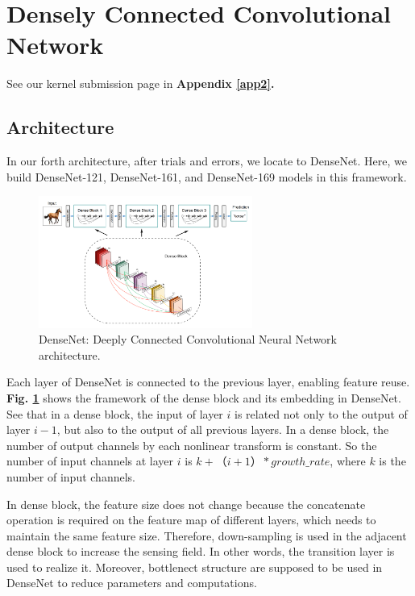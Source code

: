 \documentclass[10pt,twocolumn,letterpaper]{article}
\begin{document}

\section{Densely Connected Convolutional Network} \label{SECdense}

See our kernel submission page in \textbf{Appendix \ref{app2}.}

\subsection{Architecture}

In our forth architecture, after trials and errors, we locate to \textsf{DenseNet}. Here, we build \textsf{DenseNet-121}, \textsf{DenseNet-161}, and \textsf{DenseNet-169} models in this framework.

\begin{figure}[h]
\centering
\includegraphics[width=7cm]{densenet.pdf}
\caption{\textsf{DenseNet}: Deeply Connected Convolutional Neural Network architecture.}
\label{densenetarch}
\end{figure}

Each layer of \textsf{DenseNet} is connected to the previous layer, enabling feature reuse. \textbf{Fig. \ref{densenetarch}} shows the framework of the dense block and its embedding in \textsf{DenseNet}. See that in a dense block, the input of layer $i$ is related not only to the output of layer $i-1$, but also to the output of all previous layers. In a dense block, the number of output channels by each nonlinear transform is constant. So the number of input channels at layer $i$ is $k+（i+1）* growth\_rate$, where $k$ is the number of input channels.

In dense block, the feature size does not change because the concatenate operation is required on the feature map of different layers, which needs to maintain the same feature size. Therefore, down-sampling is used in the adjacent dense block to increase the sensing field. In other words, the transition layer is used to realize it. Moreover, bottlenect structure are supposed to be used in \textsf{DenseNet} to reduce parameters and computations.
\end{document}
